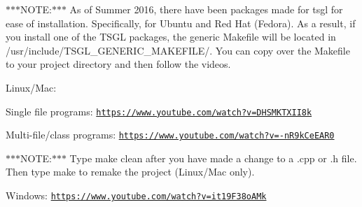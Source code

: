 $\ast$$\ast$$\ast$\-N\-O\-T\-E\-:$\ast$$\ast$$\ast$ As of Summer 2016, there have been packages made for tsgl for ease of installation. Specifically, for Ubuntu and Red Hat (Fedora). As a result, if you install one of the T\-S\-G\-L packages, the generic {\ttfamily Makefile} will be located in {\ttfamily /usr/include/\-T\-S\-G\-L\-\_\-\-G\-E\-N\-E\-R\-I\-C\-\_\-\-M\-A\-K\-E\-F\-I\-L\-E/}. You can copy over the {\ttfamily Makefile} to your project directory and then follow the videos.

Linux/\-Mac\-:


\begin{DoxyItemize}
\item Single file programs\-: \href{https://www.youtube.com/watch?v=DHSMKTXII8k}{\tt https\-://www.\-youtube.\-com/watch?v=\-D\-H\-S\-M\-K\-T\-X\-I\-I8k}
\item Multi-\/file/class programs\-: \href{https://www.youtube.com/watch?v=-nR9kCeEAR0}{\tt https\-://www.\-youtube.\-com/watch?v=-\/n\-R9k\-Ce\-E\-A\-R0}
\end{DoxyItemize}

$\ast$$\ast$$\ast$\-N\-O\-T\-E\-:$\ast$$\ast$$\ast$ Type {\ttfamily make clean} after you have made a change to a {\ttfamily .cpp} or {\ttfamily .h} file. Then type {\ttfamily make} to remake the project (Linux/\-Mac only).

Windows\-: \href{https://www.youtube.com/watch?v=it19F38oAMk}{\tt https\-://www.\-youtube.\-com/watch?v=it19\-F38o\-A\-Mk} 